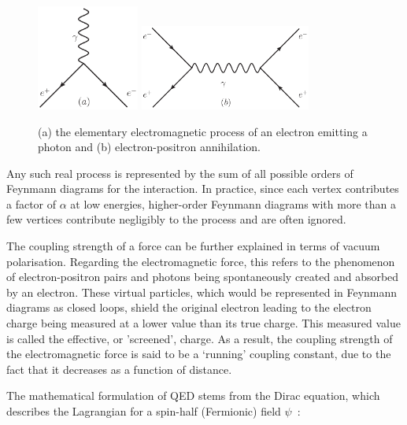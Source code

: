 \begin{figure}[hbtp]
   \centering
     \includegraphics[width=0.3\textwidth]{Chapters/03_Theory/Images/e_e_gamma}\hfill
     \includegraphics[width=0.5\textwidth]{Chapters/03_Theory/Images/e_e_gamma_e_e}
     \caption[Elementary electromagnetic processes.]{(a) the elementary electromagnetic process of an electron
     emitting a photon and (b) electron-positron annihilation.}
     \label{fig:qed_processes}
\end{figure}

Any such real process is represented by the sum of all possible orders of Feynmann diagrams for the
interaction. In practice, since each vertex contributes a factor of $\alpha$ at low energies, higher-order
Feynmann diagrams with more than a few vertices contribute negligibly to the process and are often ignored.

The coupling strength of a force can be further explained in terms of vacuum polarisation. Regarding the
electromagnetic force, this refers to the phenomenon of electron-positron pairs and photons being
spontaneously created and absorbed by an electron. These virtual particles, which would be represented in
Feynmann diagrams as closed loops, shield the original electron leading to the electron charge being measured
at a lower value than its true charge. This measured value is called the effective, or 'screened', charge. As
a result, the coupling strength of the electromagnetic force is said to be a `running' coupling
constant, due to the fact that it decreases as a function of distance.

The mathematical formulation of QED stems from the Dirac equation, which describes the Lagrangian for a
spin-half (Fermionic) field $\psi$~\cite{Dirac610}:

